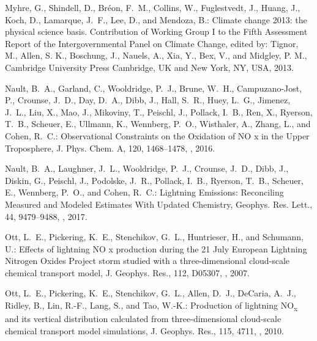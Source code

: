 \documentclass[amt]{copernicus}
\begin{document}
\begin{thebibliography}{105}
Myhre, G., Shindell, D., Bréon, F.~M., Collins, W., Fuglestvedt, J., Huang,
  J., Koch, D., Lamarque, J.~F., Lee, D., and Mendoza, B.: Climate change 2013:
  the physical science basis. Contribution of Working Group I to the Fifth
  Assessment Report of the Intergovernmental Panel on Climate Change, edited by:
  Tignor, M., Allen, S. K., Boschung, J., Nauels, A., Xia, Y., Bex, V., and
  Midgley, P. M., Cambridge University Press Cambridge, UK and New
  York, NY, USA, 2013.

Nault, B.~A., Garland, C., Wooldridge, P.~J., Brune, W.~H., Campuzano-Jost, P.,
  Crounse, J.~D., Day, D.~A., Dibb, J., Hall, S.~R., Huey, L.~G., Jimenez,
  J.~L., Liu, X., Mao, J., Mikoviny, T., Peischl, J., Pollack, I.~B., Ren, X.,
  Ryerson, T.~B., Scheuer, E., Ullmann, K., Wennberg, P.~O., Wisthaler, A.,
  Zhang, L., and Cohen, R.~C.: Observational Constraints on the Oxidation of NO
  x in the Upper Troposphere, J. Phys. Chem. A, 120,
  1468--1478, , 2016.

Nault, B.~A., Laughner, J.~L., Wooldridge, P.~J., Crounse, J.~D., Dibb, J.,
  Diskin, G., Peischl, J., Podolske, J.~R., Pollack, I.~B., Ryerson, T.~B.,
  Scheuer, E., Wennberg, P.~O., and Cohen, R.~C.: Lightning 
  Emissions: Reconciling Measured and Modeled Estimates With Updated
  Chemistry, Geophys. Res. Lett., 44, 9479--9488,
  , 2017.

Ott, L.~E., Pickering, K.~E., Stenchikov, G.~L., Huntrieser, H., and Schumann,
  U.: Effects of lightning NO x production during the 21 July European
  Lightning Nitrogen Oxides Project storm studied with a three-dimensional
  cloud-scale chemical transport model, J. Geophys. Res., 112,
 D05307, , 2007.

Ott, L.~E., Pickering, K.~E., Stenchikov, G.~L., Allen, D.~J., DeCaria, A.~J.,
  Ridley, B., Lin, R.-F., Lang, S., and Tao, W.-K.: Production of lightning
  NO\textsubscript{x} and its vertical distribution calculated from
  three-dimensional cloud-scale chemical transport model simulations, J. Geophys. Res., 115, 4711, , 2010.


\end{thebibliography}
\end{document}
